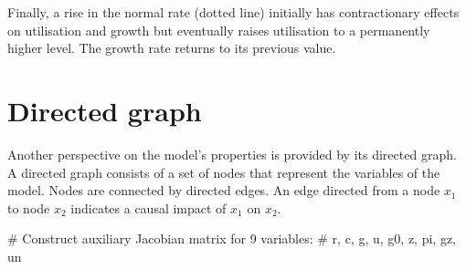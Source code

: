 \documentclass[
  letterpaper,
  DIV=11,
  numbers=noendperiod]{scrreprt}
\newenvironment{Shaded}{\begin{snugshade}}{\end{snugshade}}
\newcommand{\CommentTok}[1]{\textcolor[rgb]{0.37,0.37,0.37}{#1}}
\begin{document}
Finally, a rise in the normal rate (dotted line) initially has
contractionary effects on utilisation and growth but eventually raises
utilisation to a permanently higher level. The growth rate returns to
its previous value.

\section{Directed graph}\label{directed-graph-8}

Another perspective on the model's properties is provided by its
directed graph. A directed graph consists of a set of nodes that
represent the variables of the model. Nodes are connected by directed
edges. An edge directed from a node \(x_1\) to node \(x_2\) indicates a
causal impact of \(x_1\) on \(x_2\).

\begin{Shaded}
\begin{Highlighting}[]
\CommentTok{\# Construct auxiliary Jacobian matrix for 9 variables: }
\CommentTok{\# r, c, g, u, g0, z, pi, gz, un}


\end{Highlighting}
\end{Shaded}
\end{document}
